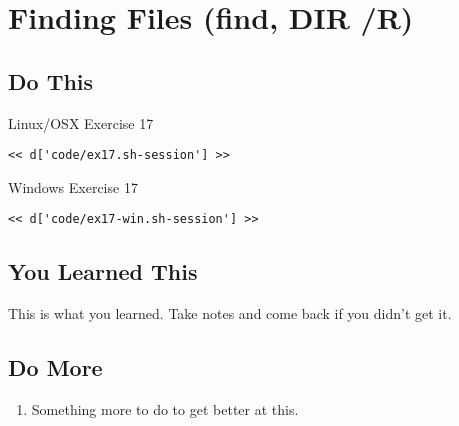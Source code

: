 \chapter{Finding Files (find, DIR /R)}

\section{Do This}

\begin{code}{Linux/OSX Exercise 17}
\begin{Verbatim}
<< d['code/ex17.sh-session'] >>
\end{Verbatim}
\end{code}

\begin{code}{Windows Exercise 17}
\begin{Verbatim}
<< d['code/ex17-win.sh-session'] >>
\end{Verbatim}
\end{code}

\section{You Learned This}

This is what you learned.  Take notes and come back if you didn't get it.

\section{Do More}

\begin{enumerate}
\item Something more to do to get better at this.
\end{enumerate}

